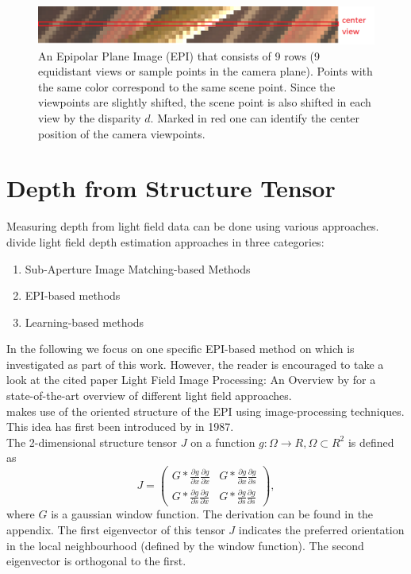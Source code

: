 \documentclass  [
  paper    = a4,
  BCOR     = 10mm,
  twoside,
  fontsize = 12pt,
  fleqn,
  toc      = bibnumbered,
  toc      = listofnumbered,
  numbers  = noendperiod,
  headings = normal,
  listof   = leveldown,
  version  = 3.03
]                                       {scrreprt}
\begin{document}
\begin{figure}
	\centering
	\includegraphics[width=1\linewidth]{images/simple_epi}
	\caption[Example Epipolar Plane image]{An Epipolar Plane Image (EPI) that consists of 9 rows (9 equidistant views or sample points in the camera plane). Points with the same color correspond to the same scene point. Since the viewpoints are slightly shifted, the scene point is also shifted in each view by the disparity $d$. Marked in red one can identify the center position of the camera viewpoints.}
	\label{fig:simpleepi}
\end{figure}


\section{Depth from Structure Tensor}
Measuring depth from light field data can be done using various approaches.
\cite{wu2017light} divide light field depth estimation approaches in three categories:
\begin{enumerate}
	\item Sub-Aperture Image Matching-based Methods
	\item EPI-based methods
	\item Learning-based methods
\end{enumerate}
In the following we focus on one specific EPI-based method on which is investigated as part of this work. However, the reader is encouraged to take a look at the cited paper \glqq Light Field Image Processing: An Overview \grqq by \cite{wu2017light} for a state-of-the-art overview of different light field approaches.\\
\cite{wanner2014orientation} makes use of the oriented structure of the EPI using image-processing techniques. This idea has first been introduced by \cite{bigun1987optimal} in 1987.\\

The 2-dimensional structure tensor $J$  on a function $g:\Omega \rightarrow \!R, \Omega \subset \!R^2 $ is defined as
\begin{equation}\label{eq:structuretensor}
J =\left(
\begin{matrix}
G*\frac{\partial g}{\partial x}\frac{\partial g}{\partial x} & G*\frac{\partial g}{\partial x}\frac{\partial g}{\partial s} \\
G*\frac{\partial g}{\partial s}\frac{\partial g}{\partial x} & G*\frac{\partial g}{\partial s}\frac{\partial g}{\partial s} 
\end{matrix}\right),
\end{equation}
 where $G$ is a gaussian window function. The derivation can be found in the appendix.
 The first eigenvector of this tensor $J$ indicates the preferred orientation in the local neighbourhood (defined by the window function). The second eigenvector is orthogonal to the first. 
 
\end{document}
